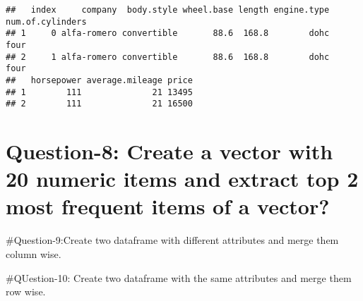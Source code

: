 \documentclass[
]{article}
\begin{document}
\begin{verbatim}
##   index     company  body.style wheel.base length engine.type num.of.cylinders
## 1     0 alfa-romero convertible       88.6  168.8        dohc             four
## 2     1 alfa-romero convertible       88.6  168.8        dohc             four
##   horsepower average.mileage price
## 1        111              21 13495
## 2        111              21 16500
\end{verbatim}

\hypertarget{question-8-create-a-vector-with-20-numeric-items-and-extract-top-2-most-frequent-items-of-a-vector}{%
\section{Question-8: Create a vector with 20 numeric items and extract
top 2 most frequent items of a
vector?}\label{question-8-create-a-vector-with-20-numeric-items-and-extract-top-2-most-frequent-items-of-a-vector}}

\#Question-9:Create two dataframe with different attributes and merge
them column wise.

\#QUestion-10: Create two dataframe with the same attributes and merge
them row wise.
\end{document}
